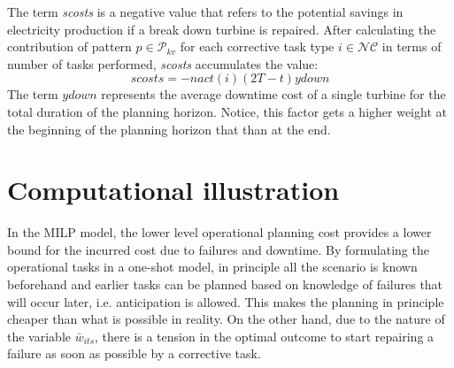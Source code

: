 The term \emph{scosts} is a negative value that refers to the potential savings in electricity production if a break down turbine is repaired. After calculating the contribution of pattern $p\in\mathcal{P}_{kv}$ for each  corrective task type $i\in \mathcal{NC}$ in terms of number of tasks performed, \emph{scosts} accumulates the value:
%
$$scosts=-nact(i)(2T-t)ydown$$
%
The term $ydown$ represents the average downtime cost of a single turbine for the total duration of the planning horizon. Notice, this factor gets a higher weight at the beginning of the planning horizon that than at the end.









		


\section{Computational illustration}
\label{sec:computationalstudyEJOR}

In the MILP model, the lower level operational planning cost provides a lower bound for the incurred cost due to failures and downtime. By formulating the operational tasks in a one-shot model, in principle all the scenario is known beforehand and earlier tasks can be planned based on knowledge of failures that will occur later, i.e. anticipation is allowed. This makes the planning in principle cheaper than what is possible in reality. On the other hand, due to the  nature of the variable $\bar{w}_{its}$, there is a tension in the optimal outcome to start repairing a failure as soon as possible by a corrective task.


